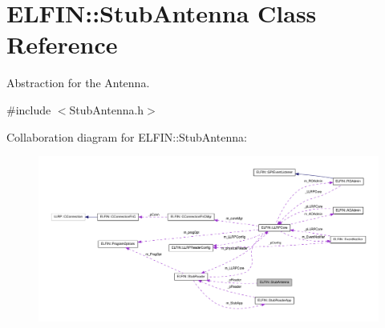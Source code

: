 \hypertarget{class_e_l_f_i_n_1_1_stub_antenna}{\section{E\-L\-F\-I\-N\-:\-:Stub\-Antenna Class Reference}
\label{class_e_l_f_i_n_1_1_stub_antenna}
}


Abstraction for the Antenna.  




{\ttfamily \#include $<$Stub\-Antenna.\-h$>$}



Collaboration diagram for E\-L\-F\-I\-N\-:\-:Stub\-Antenna\-:
\nopagebreak
\begin{figure}[H]
\begin{center}
\leavevmode
\includegraphics[width=350pt]{class_e_l_f_i_n_1_1_stub_antenna__coll__graph}
\end{center}
\end{figure}
